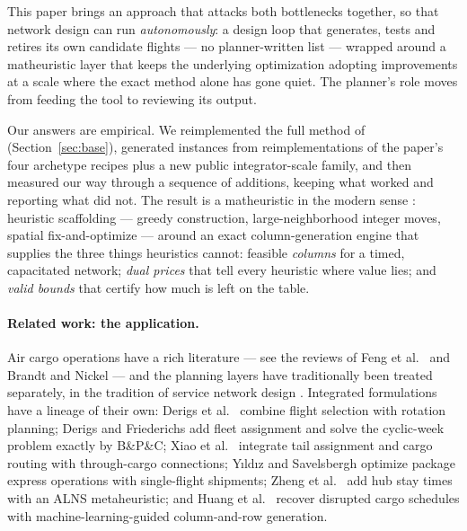 \documentclass[11pt]{article}
\begin{document}
This paper brings an approach that attacks both bottlenecks together, so
that network design can run \emph{autonomously}: a design loop that
generates, tests and retires its own candidate flights --- no
planner-written list --- wrapped around a matheuristic layer that keeps
the underlying optimization adopting improvements at a scale where the
exact method alone has gone quiet. The planner's role moves from feeding
the tool to reviewing its output.

Our answers are empirical. We reimplemented the full method of
\cite{derigs2013} (Section~\ref{sec:base}), generated instances from
reimplementations of the paper's four archetype recipes plus a new public
integrator-scale family, and then measured our way through a sequence of
additions, keeping what worked and reporting what did not. The result is a
matheuristic in the modern sense \cite{archetti2014,fischetti2018}: heuristic
scaffolding --- greedy construction, large-neighborhood integer moves,
spatial fix-and-optimize --- around an exact column-generation engine that
supplies the three things heuristics cannot: feasible \emph{columns} for a
timed, capacitated network; \emph{dual prices} that tell every heuristic
where value lies; and \emph{valid bounds} that certify how much is left on
the table.

\paragraph{Related work: the application.} Air cargo operations have a rich
literature --- see the reviews of Feng et al.\ \cite{feng2015} and Brandt and
Nickel \cite{brandt2019} --- and the planning layers have traditionally been
treated separately, in the tradition of service network design
\cite{crainic2000}. Integrated formulations have a lineage of their own:
Derigs et al.\ \cite{derigs2009} combine flight selection with rotation
planning; Derigs and Friederichs \cite{derigs2013} add fleet assignment and
solve the cyclic-week problem exactly by B\&P\&C; Xiao et al.\
\cite{xiao2022} integrate tail assignment and cargo routing with
through-cargo connections; Y{\i}ld{\i}z and Savelsbergh \cite{yildiz2022}
optimize package express operations with single-flight shipments; Zheng
et al.\ \cite{zheng2023} add hub stay times with an ALNS metaheuristic; and
Huang et al.\ \cite{huang2023} recover disrupted cargo schedules with
machine-learning-guided column-and-row generation.
\end{document}
